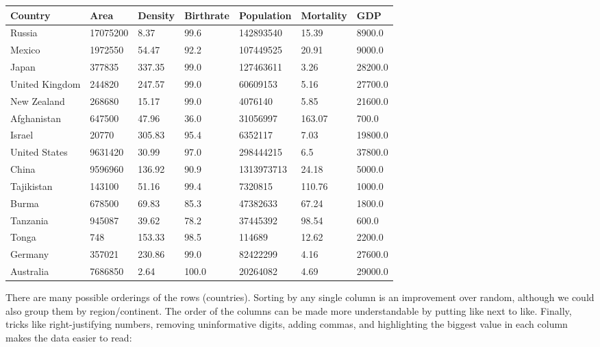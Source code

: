 \documentclass[10pt]{article}
\begin{document}
\begin{tabular}{l|llllll}
Country & Area & Density & Birthrate & Population & Mortality & GDP \\
\hline
Russia & 17075200 & 8.37 & 99.6 & 142893540 & 15.39 & 8900.0 \\
Mexico & 1972550 & 54.47 & 92.2 & 107449525 & 20.91 & 9000.0 \\
Japan & 377835 & 337.35 & 99.0 & 127463611 & 3.26 & 28200.0 \\
United Kingdom & 244820 & 247.57 & 99.0 & 60609153 & 5.16 & 27700.0 \\
New Zealand & 268680 & 15.17 & 99.0 & 4076140 & 5.85 & 21600.0 \\
Afghanistan & 647500 & 47.96 & 36.0 & 31056997 & 163.07 & 700.0 \\
Israel & 20770 & 305.83 & 95.4 & 6352117 & 7.03 & 19800.0 \\
United States & 9631420 & 30.99 & 97.0 & 298444215 & 6.5 & 37800.0 \\
China & 9596960 & 136.92 & 90.9 & 1313973713 & 24.18 & 5000.0 \\
Tajikistan & 143100 & 51.16 & 99.4 & 7320815 & 110.76 & 1000.0 \\
Burma & 678500 & 69.83 & 85.3 & 47382633 & 67.24 & 1800.0 \\
Tanzania & 945087 & 39.62 & 78.2 & 37445392 & 98.54 & 600.0 \\
Tonga & 748 & 153.33 & 98.5 & 114689 & 12.62 & 2200.0 \\
Germany & 357021 & 230.86 & 99.0 & 82422299 & 4.16 & 27600.0 \\
Australia & 7686850 & 2.64 & 100.0 & 20264082 & 4.69 & 29000.0 \\
\hline
\end{tabular}

There are many possible orderings of the rows (countries). Sorting by any single column is an improvement over random, although we could also group them by region/continent. The order of the columns can be made more understandable by putting like next to like. Finally, tricks like right-justifying numbers, removing uninformative digits, adding commas, and highlighting the biggest value in each column makes the data easier to read:
\end{document}
